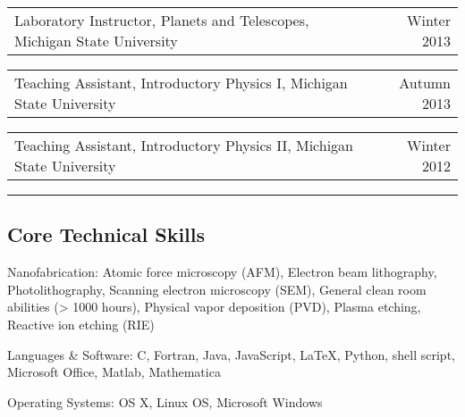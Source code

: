 \documentclass[10pt,letterpaper]{article}
\makeatletter
\newenvironment{indentsection}[1]%
{\begin{list}{}%
	{\setlength{\leftmargin}{#1}}%
	\item[]%
}
{\end{list}}
\newcommand{\headerrow}[2]
{\begin{tabular*}{\linewidth}{l@{\extracolsep{\fill}}r}
	#1 &
	#2 \\
\end{tabular*}}
\newcommand{\CPP}
{C\nolinebreak[4]\hspace{-.05em}\raisebox{.22ex}{\footnotesize\bf ++}}
\makeatother
\begin{document}
\begin{itemize*}
	\item[]
	\headerrow
		{Laboratory Instructor, Planets and Telescopes, Michigan State University}
		{Winter 2013}

	\item[]
	\headerrow
		{Teaching Assistant, Introductory Physics I, Michigan State University}
		{Autumn 2013}

	\item[]
	\headerrow
		{Teaching Assistant, Introductory Physics II, Michigan State University}
		{Winter 2012}

	\begin{comment}
	\item[]
	\headerrow
		{Teaching Assistant, Wayne State University}
		{Autumn 2014 -- Summer 2018}
	\item[]
	\headerrow
		{Teaching Assistant, Michigan State University}
		{Winter 2012 -- Winter 2014}
	\end{comment}

\end{itemize*}

\hrule
\vspace{-0.4em}
\subsection*{Core Technical Skills}

\begin{indentsection}{\parindent}
\begin{description*}
	\item[Nanofabrication:]
	Atomic force microscopy (AFM), Electron beam lithography, Photolithography, Scanning electron microscopy (SEM), General clean room abilities (> 1000 hours), Physical vapor deposition (PVD), Plasma etching, Reactive ion etching (RIE)
	\item[Languages \& Software:]
	\CPP, Fortran, Java, JavaScript, \LaTeX, Python, shell script, Microsoft Office, Matlab, Mathematica
	\item[Operating Systems:]
	OS X, Linux OS, Microsoft Windows
\end{description*}
\end{indentsection}
\end{document}
